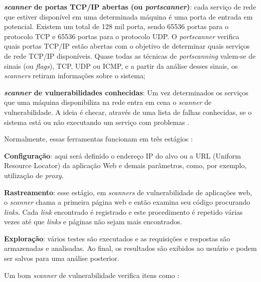 \begin{alineas}
\item \textbf{\textit{scanner} de portas TCP/IP abertas (ou \textit{portscanner})}: cada serviço de rede que estiver disponível em uma determinada máquina é uma porta de entrada em potencial. Existem um total de 128 mil porta, sendo 65536 portas para o protocolo TCP e 65536 portas para o protocolo UDP. O \textit{portscanner} verifica quais portas TCP/IP estão abertas com o objetivo de determinar quais serviços de rede TCP/IP disponíveis. Quase todas as técnicas de \textit{portscanning} valem-se de sinais (ou \textit{flags}), TCP, UDP ou ICMP, e a partir da análise desses sinais, os \textit{scanners} retiram informações sobre o sistema; \cite{univhacker}
\item \textbf{\textit{scanner} de vulnerabilidades conhecidas}: Um vez determinados os serviços que uma máquina disponibiliza na rede entra em cena o \textit{scanner} de vulnerabilidade. A ideia é checar, através de uma lista de falhas conhecidas, se o sistema está ou não executando um serviço com problemas \cite{univhacker}. 
\end{alineas}

Normalmente, essas ferramentas funcionam em três estágios \cite{avaliacao:tania}:

\begin{alineas}
 \item \textbf{Configuração}: aqui será definido o endereço IP do alvo ou a URL (Uniform Resource Locator) da aplicação Web e demais parâmetros, como, por exemplo, utilização de \textit{proxy}.
 \item \textbf{Rastreamento}: esse estágio, em \textit{scanners} de vulnerabilidade de aplicações web, o \textit{scanner} chama a primeira página web e então examina seu código procurando \textit{links}. Cada \textit{link} encontrado é registrado e este procedimento é repetido várias vezes até que \textit{links} e páginas não sejam mais encontrados.
 \item \textbf{Exploração}: vários testes são executados e as requisições e respostas são armazenadas e analisadas. Ao final, os resultados são exibidos ao usuário e podem ser salvos para uma análise posterior. 
\end{alineas}

Um bom \textit{scanner} de vulnerabilidade verifica itens como \cite{univhacker}: 

